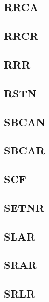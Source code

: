 \documentclass[a4paper]{article}
\begin{document}
\subsection{RRCA}
\sailfclRRCAdecode
\sailfclRRCAassembly
\sailfclRRCAexecute
\subsection{RRCR}
\sailfclRRCRrdecodeOneSix
\sailfclRRCRassembly
\sailfclRRCRexecute
\subsection{RRR}
\sailfclRRRrdecodeOneSix
\sailfclRRRassembly
\sailfclRRRexecute
\subsection{RSTN}
\sailfclRSTNrdecode
\sailfclRSTNassembly
\sailfclRSTNexecute
\subsection{SBCAN}
\sailfclSBCANimmdecodeOneSix
\sailfclSBCANassembly
\sailfclSBCANexecute
\subsection{SBCAR}
\sailfclSBCARrdecode
\sailfclSBCARassembly
\sailfclSBCARexecute
\subsection{SCF}
\sailfclSCFdecode
\sailfclSCFassembly
\sailfclSCFexecute
\subsection{SETNR}
\sailfclSETNRdecodeOneSix
\sailfclSETNRassembly
\sailfclSETNRexecute
\subsection{SLAR}
\sailfclSLARrdecodeOneSix
\sailfclSLARassembly
\sailfclSLARexecute
\subsection{SRAR}
\sailfclSRARrdecodeOneSix
\sailfclSRARassembly
\sailfclSRARexecute
\subsection{SRLR}
\sailfclSRLRrdecodeOneSix
\sailfclSRLRassembly
\sailfclSRLRexecute
\end{document}
